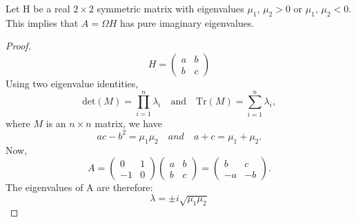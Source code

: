 \begin{comment}
\begin{lemma}Let A be a real $2 \times 2$ Hamiltonian matrix with eigenvalues $\pm\beta i$, $\beta \neq 0$. Then there exists a real $2 \times 2$ symplectic matrix $S$ such that:
\begin{equation}
S^{-1}AS = \begin{pmatrix} 0 & \beta \\ -\beta & 0 \end{pmatrix} \quad or \quad S^{-1}AS = \begin{pmatrix} 0 & -\beta \\ \beta & 0  \end{pmatrix}
\end{equation} \label{lem:real22}
\end{lemma}
\begin{proof}
See p47 Meyer.
\end{proof}
Possibly not needed.
\end{comment}

\begin{lemma}Let H be a real $2\times 2$ symmetric matrix with eigenvalues $\mu_1, \, \mu_2 > 0$ or $\mu_1, \, \mu_2 < 0$. This implies that $A=\Omega H$ has pure imaginary eigenvalues. \label{lem:htoa} \end{lemma} 
\begin{proof}
\begin{equation}
H = \begin{pmatrix} a & b \\ b & c \end{pmatrix}
\end{equation}
Using two eigenvalue identities,
\begin{equation}
\text{det}(M) = \prod_{i=1}^n \lambda_i \quad \text{and} \quad \text{Tr}(M) = \sum_{i=1}^n \lambda_i,
\end{equation}
where $M$ is an $n \times n$ matrix, we have
\begin{equation}
ac-b^2 = \mu_1\mu_2 \quad and \quad a+c = \mu_1+\mu_2.
\end{equation}
Now,
\begin{equation}
A = \begin{pmatrix} 0 & 1 \\ -1 & 0 \end{pmatrix} \begin{pmatrix} a & b \\ b & c \end{pmatrix} = \begin{pmatrix} b & c \\ -a & -b \end{pmatrix}.
\end{equation}
The eigenvalues of A are therefore:
\begin{equation}
\lambda = \pm i\sqrt{\mu_1\mu_2}
\end{equation}
\end{proof}

